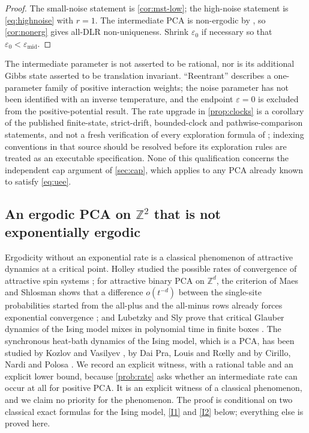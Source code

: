 \documentclass[11pt]{article}
\theoremstyle{plain}
\theoremstyle{definition}
\theoremstyle{remark}
\newcommand{\Z}{\mathbb{Z}}
\newcommand{\eps}{\varepsilon}
\begin{document}
\begin{proof}
The small-noise statement is \cref{cor:mst-low}; the high-noise statement is \eqref{eq:highnoise} with $r=1$. The intermediate PCA is non-ergodic by \cite[Theorem~3.1]{MST26}, so \cref{cor:nonerg} gives all-DLR non-uniqueness. Shrink $\eps_0$ if necessary so that $\eps_0<\eps_{\mathrm{mid}}$.
\end{proof}

The intermediate parameter is not asserted to be rational, nor is its additional Gibbs state asserted to be translation invariant. ``Reentrant'' describes a one-parameter family of positive interaction weights; the noise parameter has not been identified with an inverse temperature, and the endpoint $\eps=0$ is excluded from the positive-potential result. The rate upgrade in \cref{prop:clocks} is a corollary of the published finite-state, strict-drift, bounded-clock and pathwise-comparison statements, and not a fresh verification of every exploration formula of \cite{MST26}; indexing conventions in that source should be resolved before its exploration rules are treated as an executable specification. None of this qualification concerns the independent cap argument of \cref{sec:cap}, which applies to any PCA already known to satisfy \eqref{eq:uee}.

\subsection{An ergodic PCA on \texorpdfstring{$\Z^2$}{Z\^{}2} that is not exponentially ergodic}
\label{sec:critical}

Ergodicity without an exponential rate is a classical phenomenon of attractive dynamics at a critical point. Holley studied the possible rates of convergence of attractive spin systems \cite{Holley85}; for attractive binary PCA on $\Z^d$, the criterion of Maes and Shlosman shows that a difference $o(t^{-d})$ between the single-site probabilities started from the all-plus and the all-minus rows already forces exponential convergence \cite[Corollary~2]{MS93}; and Lubetzky and Sly prove that critical Glauber dynamics of the Ising model mixes in polynomial time in finite boxes \cite{LS12}. The synchronous heat-bath dynamics of the Ising model, which is a PCA, has been studied by Kozlov and Vasilyev \cite{KV80}, by Dai Pra, Louis and R\oe lly \cite{DLR02} and by Cirillo, Nardi and Polosa \cite{CNP01}. We record an explicit witness, with a rational table and an explicit lower bound, because \cref{prob:rate} asks whether an intermediate rate can occur at all for positive PCA. It is an explicit witness of a classical phenomenon, and we claim no priority for the phenomenon. The proof is conditional on two classical exact formulas for the Ising model, \ref{I1} and \ref{I2} below; everything else is proved here.
\end{document}
